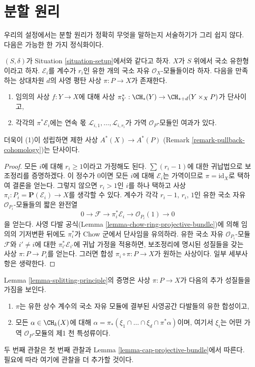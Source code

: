 \section{분할 원리}
\label{section-splitting-principle}

\noindent
우리의 설정에서는 분할 원리가 정확히 무엇을 말하는지 서술하기가 그리
쉽지 않다. 다음은 가능한 한 가지 정식화이다.

\begin{lemma}
\label{lemma-splitting-principle}
$(S, \delta)$가 Situation \ref{situation-setup}에서와 같다고 하자. $X$가
$S$ 위에서 국소 유한형이라고 하자. $\mathcal{E}_i$를 계수가 $r_i$인
유한 개의 국소 자유 $\mathcal{O}_X$-모듈들이라 하자. 다음을 만족하는
상대차원 $d$의 사영 평탄 사상 $\pi : P \to X$가 존재한다.
\begin{enumerate}
\item 임의의 사상 $f : Y \to X$에 대해 사상
$\pi_Y^* : \CH_*(Y) \to \CH_{* + d}(Y \times_X P)$가 단사이고,
\item 각각의 $\pi^*\mathcal{E}_i$에는 연속 몫
$\mathcal{L}_{i, 1}, \ldots, \mathcal{L}_{i, r_i}$가 가역
${\mathcal O}_P$-모듈인 여과가 있다.
\end{enumerate}
더욱이 (1)이 성립하면 제한 사상 $A^*(X) \to A^*(P)$
(Remark \ref{remark-pullback-cohomology})는 단사이다.
\end{lemma}

\begin{proof}
모든 $i$에 대해 $r_i \geq 1$이라고 가정해도 된다.
$\sum (r_i - 1)$에 대한 귀납법으로 보조정리를 증명하겠다. 이 정수가
$0$이면 모든 $i$에 대해 $\mathcal{E}_i$는 가역이므로
$\pi = \text{id}_X$로 택하여 결론을 얻는다. 그렇지 않으면
$r_i > 1$인 $i$를 하나 택하고 사상
$\pi_i : P_i = \mathbf{P}(\mathcal{E}_i) \to X$를 생각할 수 있다.
계수가 각각 $r_i - 1$, $r_i$, $1$인 유한 국소 자유
$\mathcal{O}_{P_i}$-모듈들의 짧은 완전열
$$
0 \to \mathcal{F} \to \pi_i^*\mathcal{E}_i \to \mathcal{O}_{P_i}(1) \to 0
$$
을 얻는다. 사영 다발 공식(Lemma
\ref{lemma-chow-ring-projective-bundle})에 의해 임의의 기저변환 뒤에도
$\pi_i^*$가 Chow 군에서 단사임을 유의하라. 유한 국소 자유
$\mathcal{O}_{P_i}$-모듈 $\mathcal{F}$와 $i' \not = i$에 대한
$\pi_{i'}^*\mathcal{E}_{i'}$에 귀납 가정을 적용하면, 보조정리에 명시된
성질들을 갖는 사상 $\pi : P \to P_i$를 얻는다. 그러면 합성
$\pi_i \circ \pi : P \to X$가 원하는 사상이다. 일부 세부사항은
생략한다.
\end{proof}

\begin{remark}
\label{remark-the-proof-shows-more}
Lemma \ref{lemma-splitting-principle}의 증명은 사상
$\pi : P \to X$가 다음의 추가 성질들을 가짐을 보인다.
\begin{enumerate}
\item $\pi$는 유한 상수 계수의 국소 자유 모듈에 결부된 사영공간
다발들의 유한 합성이고,
\item 모든 $\alpha \in \CH_k(X)$에 대해
$\alpha = \pi_*(\xi_1 \cap \ldots \cap \xi_d \cap \pi^*\alpha)$이며,
여기서 $\xi_i$는 어떤 가역 $\mathcal{O}_P$-모듈의 제1 천 특성류이다.
\end{enumerate}
두 번째 관찰은 첫 번째 관찰과 Lemma
\ref{lemma-cap-projective-bundle}에서 따른다. 필요에 따라 여기에
관찰을 더 추가할 것이다.
\end{remark}

